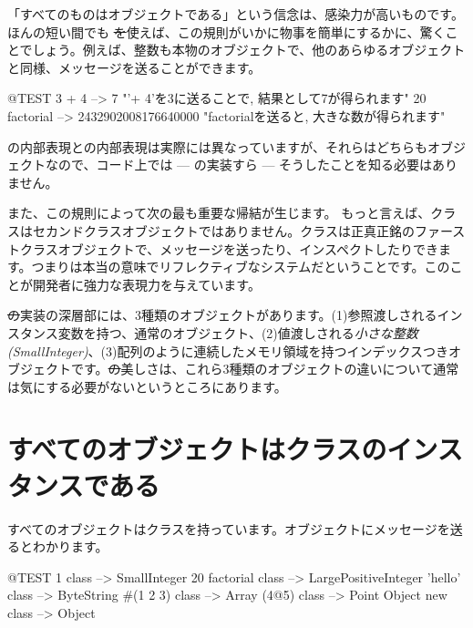 \documentclass[a4paper,10pt,twoside]{book}
\begin{document}

「すべてのものはオブジェクトである」という信念は、感染力が高いものです。ほんの短い間でも \st を使えば、この規則がいかに物事を簡単にするかに、驚くことでしょう。例えば、整数も本物のオブジェクトで、他のあらゆるオブジェクトと同様、メッセージを送ることができます。

\begin{code}{@TEST}
3 + 4            --> 7    "'+ 4'を3に送ることで, 結果として7が得られます"
20 factorial  --> 2432902008176640000   "factorialを送ると, 大きな数が得られます"
\end{code}

の内部表現との内部表現は実際には異なっていますが、それらはどちらもオブジェクトなので、コード上では --- の実装すら --- そうしたことを知る必要はありません。

また、この規則によって次の最も重要な帰結が生じます。
もっと言えば、クラスはセカンドクラスオブジェクトではありません。クラスは正真正銘のファーストクラスオブジェクトで、メッセージを送ったり、インスペクトしたりできます。つまり\pharo は本当の意味でリフレクティブなシステムだということです。このことが開発者に強力な表現力を与えています。

\st の実装の深層部には、3種類のオブジェクトがあります。(1)参照渡しされるインスタンス変数を持つ、通常のオブジェクト、(2)値渡しされる\emph{小さな整数(SmallInteger)}、(3)配列のように連続したメモリ領域を持つインデックスつきオブジェクトです。\st の美しさは、これら3種類のオブジェクトの違いについて通常は気にする必要がないというところにあります。

\section{すべてのオブジェクトはクラスのインスタンスである}


すべてのオブジェクトはクラスを持っています。オブジェクトにメッセージを送るとわかります。

\begin{code}{@TEST}
1 class                 --> SmallInteger
20 factorial class --> LargePositiveInteger
'hello' class          --> ByteString
#(1 2 3) class       --> Array
(4@5) class         --> Point
Object new class --> Object
\end{code}
\end{document}

